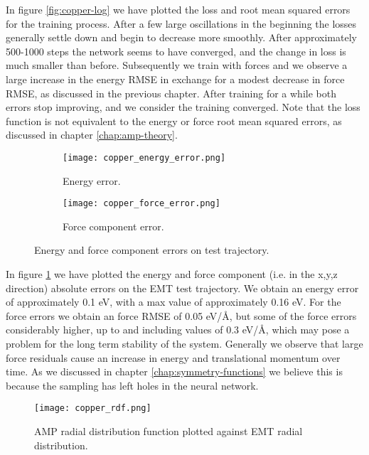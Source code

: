 In figure \ref{fig:copper-log} we have plotted the loss and root mean
squared errors for the training process.
After a few large oscillations in the beginning
the losses generally settle down and begin to decrease
more smoothly.
After approximately 500-1000 steps the network seems to have
converged, and the change in loss is much smaller than before.
Subsequently we train with forces and we observe a large increase
in the energy RMSE in exchange for a modest decrease in force RMSE,
as discussed in the previous chapter.
After training for a while both errors stop improving,
and we consider the training converged.
Note that the loss function is not equivalent to the energy or force
root mean squared errors, as discussed in chapter \ref{chap:amp-theory}.

\begin{figure}[H]
\begin{adjustbox}{max width=1.2\linewidth,center}
\centering
  \begin{subfigure}[b]{0.55\textwidth}
      \texttt{[image: copper\_energy\_error.png]}
      \caption{Energy error.}
  \end{subfigure}
  \hfill
  \begin{subfigure}[b]{0.55\textwidth}
      \texttt{[image: copper\_force\_error.png]}
      \caption{Force component error.}
  \end{subfigure}
\end{adjustbox}
    \caption{Energy and force component errors on test trajectory.}
    \label{fig:copper_error}
\end{figure}

In figure \ref{fig:copper_error} we have plotted the energy and force component
(i.e. in the x,y,z direction)
absolute errors on the EMT test trajectory. We obtain an energy error
of approximately 0.1 eV, with a max value of approximately 0.16 eV.
For the force errors we obtain an force RMSE of 0.05 eV/Å,
but some of the force errors considerably higher, up to
and including values of 0.3 eV/Å, which may pose
a problem for the long term stability of the system.
Generally we observe that large force residuals cause an increase
in energy and translational momentum over time. As we discussed
in chapter \ref{chap:symmetry-functions} we believe this is because
the sampling has left holes in the neural network.

\begin{figure}[H]
    \centering
    \texttt{[image: copper\_rdf.png]}
    \caption{AMP radial distribution function plotted against
        EMT radial distribution.}
    \label{fig:copper-rdf}
\end{figure}

